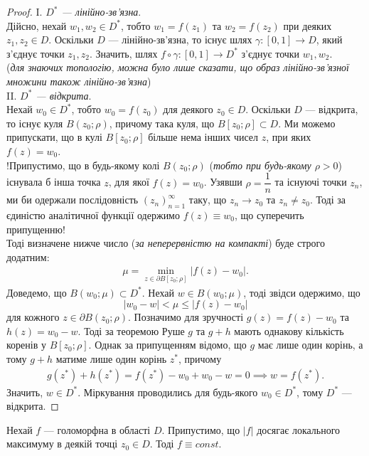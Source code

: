 \documentclass{math_library}
\begin{document}
\begin{proof}
I. \textit{$D^*$ --- лінійно-зв'язна}.\\
Дійсно, нехай $w_1,w_2 \in D^*$, тобто $w_1 = f(z_1)$ та $w_2 = f(z_2)$ при деяких $z_1,z_2 \in D$. Оскільки $D$ --- лінійно-зв'язна, то існує шлях $\gamma \colon [0,1] \to D$, який з'єднує точки $z_1,z_2$. Значить, шлях $f \circ \gamma \colon [0,1] \to D^*$ з'єднує точки $w_1,w_2$.\\
(\textit{для знаючих топологію, можна було лише сказати, що образ лінійно-зв'язної множини також лінійно-зв'язна})
\bigskip \\
II. \textit{$D^*$ --- відкрита}.\\
Нехай $w_0 \in D^*$, тобто $w_0 = f(z_0)$ для деякого $z_0 \in D$. Оскільки $D$ --- відкрита, то існує куля $B(z_0;\rho)$, причому така куля, що $B[z_0;\rho] \subset D$. Ми можемо припускати, що в кулі $B[z_0;\rho]$ більше нема інших чисел $z$, при яких $f(z) = w_0$.\\
!Припустимо, що в будь-якому колі $B(z_0;\rho)$ (\textit{тобто при будь-якому $\rho > 0$}) існувала б інша точка $z$, для якої $f(z) = w_0$. Узявши $\rho = \dfrac{1}{n}$ та існуючі точки $z_n$, ми би одержали послідовність $(z_n)_{n=1}^\infty$ таку, що $z_n \to z_0$ та $z_n \neq z_0$. Тоді за єдиністю аналітичної функції одержимо $f(z) \equiv w_0$, що суперечить припущенню!
\\
Тоді визначене нижче число (\textit{за неперервністю на компакті}) буде строго додатним:
\begin{align*}
\mu = \min_{z \in \partial B[z_0;\rho]} |f(z) - w_0|.
\end{align*}
Доведемо, що $B(w_0;\mu) \subset D^*$. Нехай $w \in B(w_0;\mu)$, тоді звідси одержимо, що
\[
|w_0 - w| < \mu \leq |f(z) - w_0|
\]
для кожного $z \in \partial B(z_0;\rho)$. Позначимо для зручності $g(z) = f(z) - w_0$ та $h(z) = w_0 - w$. Тоді за теоремою Руше $g$ та $g+h$ мають однакову кількість коренів у $B[z_0;\rho]$. Однак за припущенням відомо, що $g$ має лише один корінь, а тому $g+h$ матиме лише один корінь $z^*$, причому
\begin{align*}
g(z^*) + h(z^*) = f(z^*) - w_0 + w_0 - w = 0 \implies w = f(z^*).
\end{align*}
Значить, $w \in D^*$. Міркування проводились для будь-якого $w_0 \in D^*$, тому $D^*$ --- відкрита.
\end{proof}

\begin{theorem}
Нехай $f$ --- голоморфна в області $D$. Припустимо, що $|f|$ досягає локального максимуму в деякій точці $z_0 \in D$. Тоді $f \equiv const$.
\end{theorem}
\end{document}
